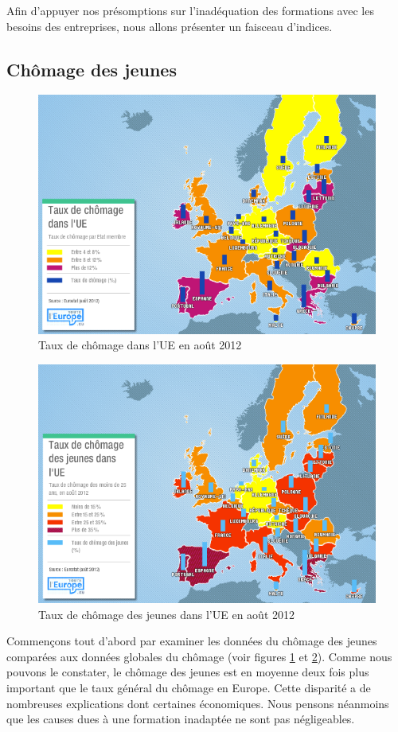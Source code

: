 Afin d'appuyer nos présomptions sur l'inadéquation des formations avec les besoins des entreprises, nous allons présenter un faisceau d'indices.

\subsection{Chômage des jeunes}
\begin{figure}[p]
\centering
\includegraphics[width=0.98\linewidth]{../resources/illustrations/chom}
\caption{Taux de chômage dans l'UE en août 2012 \cite{chom}}
\label{chom}
\end{figure}
\begin{figure}[p]
\centering
\includegraphics[width=0.98\linewidth]{../resources/illustrations/chom_jeunes}
\caption{Taux de chômage des jeunes dans l'UE en août 2012 \cite{chom_jeunes}}
\label{chom_jeunes}
\end{figure}
Commençons tout d'abord par examiner les données du chômage des jeunes comparées aux données globales du chômage (voir figures \ref{chom} et \ref{chom_jeunes}). Comme nous pouvons le constater, le chômage des jeunes est en moyenne deux fois plus important que le taux général du chômage en Europe. Cette disparité a de nombreuses explications dont certaines économiques. Nous pensons néanmoins que les causes dues à une formation inadaptée ne sont pas négligeables. 

